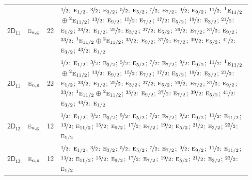 \documentclass[10pt,a4paper]{article}
\numberwithin{equation}{section}
\newcommand{\grp}[1]{\mathsf{#1}}
\newcommand{\irr}[1]{\text{\normalfont\scshape #1}}
\newcommand{\conjpair}[1]{{}^{#1}}
\newcommand{\ptag}[1]{\mathrm{#1}}
\newlength{\fillwidth}\newlength{\cellwidth}\newlength{\colwidth}
\begin{document}
{\begin{longtable}{@{}llr>{\RaggedRight\arraybackslash}p{\fillwidth}@{}}
\href{2D11.pdf}{$\grp{2D_{11}}$} & $\irr{e}_{n,\ptag{g}}$ & 22 & $\nicefrac{1}{2}$: $\irr{e}_{1/2}$; $\nicefrac{3}{2}$: $\irr{e}_{3/2}$; $\nicefrac{5}{2}$: $\irr{e}_{5/2}$; $\nicefrac{7}{2}$: $\irr{e}_{7/2}$; $\nicefrac{9}{2}$: $\irr{e}_{9/2}$; $\nicefrac{11}{2}$: $\conjpair{1}\irr{e}_{11/2}$${}\oplus{}$$\conjpair{2}\irr{e}_{11/2}$; $\nicefrac{13}{2}$: $\irr{e}_{9/2}$; $\nicefrac{15}{2}$: $\irr{e}_{7/2}$; $\nicefrac{17}{2}$: $\irr{e}_{5/2}$; $\nicefrac{19}{2}$: $\irr{e}_{3/2}$; $\nicefrac{21}{2}$: $\irr{e}_{1/2}$; $\nicefrac{23}{2}$: $\irr{e}_{1/2}$; $\nicefrac{25}{2}$: $\irr{e}_{3/2}$; $\nicefrac{27}{2}$: $\irr{e}_{5/2}$; $\nicefrac{29}{2}$: $\irr{e}_{7/2}$; $\nicefrac{31}{2}$: $\irr{e}_{9/2}$; $\nicefrac{33}{2}$: $\conjpair{1}\irr{e}_{11/2}$${}\oplus{}$$\conjpair{2}\irr{e}_{11/2}$; $\nicefrac{35}{2}$: $\irr{e}_{9/2}$; $\nicefrac{37}{2}$: $\irr{e}_{7/2}$; $\nicefrac{39}{2}$: $\irr{e}_{5/2}$; $\nicefrac{41}{2}$: $\irr{e}_{3/2}$; $\nicefrac{43}{2}$: $\irr{e}_{1/2}$\\
\href{2D11.pdf}{$\grp{2D_{11}}$} & $\irr{e}_{n,\ptag{u}}$ & 22 & $\nicefrac{1}{2}$: $\irr{e}_{1/2}$; $\nicefrac{3}{2}$: $\irr{e}_{3/2}$; $\nicefrac{5}{2}$: $\irr{e}_{5/2}$; $\nicefrac{7}{2}$: $\irr{e}_{7/2}$; $\nicefrac{9}{2}$: $\irr{e}_{9/2}$; $\nicefrac{11}{2}$: $\conjpair{1}\irr{e}_{11/2}$${}\oplus{}$$\conjpair{2}\irr{e}_{11/2}$; $\nicefrac{13}{2}$: $\irr{e}_{9/2}$; $\nicefrac{15}{2}$: $\irr{e}_{7/2}$; $\nicefrac{17}{2}$: $\irr{e}_{5/2}$; $\nicefrac{19}{2}$: $\irr{e}_{3/2}$; $\nicefrac{21}{2}$: $\irr{e}_{1/2}$; $\nicefrac{23}{2}$: $\irr{e}_{1/2}$; $\nicefrac{25}{2}$: $\irr{e}_{3/2}$; $\nicefrac{27}{2}$: $\irr{e}_{5/2}$; $\nicefrac{29}{2}$: $\irr{e}_{7/2}$; $\nicefrac{31}{2}$: $\irr{e}_{9/2}$; $\nicefrac{33}{2}$: $\conjpair{1}\irr{e}_{11/2}$${}\oplus{}$$\conjpair{2}\irr{e}_{11/2}$; $\nicefrac{35}{2}$: $\irr{e}_{9/2}$; $\nicefrac{37}{2}$: $\irr{e}_{7/2}$; $\nicefrac{39}{2}$: $\irr{e}_{5/2}$; $\nicefrac{41}{2}$: $\irr{e}_{3/2}$; $\nicefrac{43}{2}$: $\irr{e}_{1/2}$\\
\href{2D12.pdf}{$\grp{2D_{12}}$} & $\irr{e}_{n,\ptag{g}}$ & 12 & $\nicefrac{1}{2}$: $\irr{e}_{1/2}$; $\nicefrac{3}{2}$: $\irr{e}_{3/2}$; $\nicefrac{5}{2}$: $\irr{e}_{5/2}$; $\nicefrac{7}{2}$: $\irr{e}_{7/2}$; $\nicefrac{9}{2}$: $\irr{e}_{9/2}$; $\nicefrac{11}{2}$: $\irr{e}_{11/2}$; $\nicefrac{13}{2}$: $\irr{e}_{11/2}$; $\nicefrac{15}{2}$: $\irr{e}_{9/2}$; $\nicefrac{17}{2}$: $\irr{e}_{7/2}$; $\nicefrac{19}{2}$: $\irr{e}_{5/2}$; $\nicefrac{21}{2}$: $\irr{e}_{3/2}$; $\nicefrac{23}{2}$: $\irr{e}_{1/2}$\\
\href{2D12.pdf}{$\grp{2D_{12}}$} & $\irr{e}_{n,\ptag{u}}$ & 12 & $\nicefrac{1}{2}$: $\irr{e}_{1/2}$; $\nicefrac{3}{2}$: $\irr{e}_{3/2}$; $\nicefrac{5}{2}$: $\irr{e}_{5/2}$; $\nicefrac{7}{2}$: $\irr{e}_{7/2}$; $\nicefrac{9}{2}$: $\irr{e}_{9/2}$; $\nicefrac{11}{2}$: $\irr{e}_{11/2}$; $\nicefrac{13}{2}$: $\irr{e}_{11/2}$; $\nicefrac{15}{2}$: $\irr{e}_{9/2}$; $\nicefrac{17}{2}$: $\irr{e}_{7/2}$; $\nicefrac{19}{2}$: $\irr{e}_{5/2}$; $\nicefrac{21}{2}$: $\irr{e}_{3/2}$; $\nicefrac{23}{2}$: $\irr{e}_{1/2}$\\

\end{longtable}}
\end{document}
